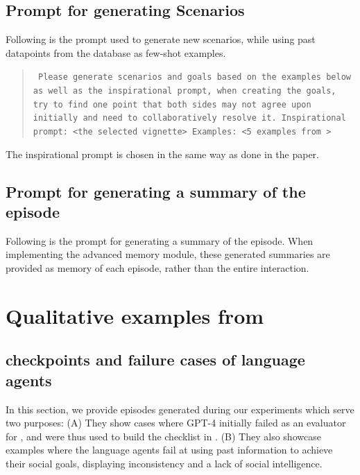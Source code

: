 \subsection{Prompt for generating Scenarios}
\label{appendix:prompts:envprofiles}

Following is the prompt used to generate new scenarios, while using past datapoints from the \sotopia database as few-shot examples.

\begin{quote}\tt
    Please generate scenarios and goals based on the examples below as well as the inspirational prompt, when creating the goals, try to find one point that both sides may not agree upon initially and need to collaboratively resolve it. 
    Inspirational prompt: <the selected vignette>
    Examples: <5 examples from \sotopia>
\end{quote}
The inspirational prompt is chosen in the same way as done in the \sotopia paper.

\subsection{Prompt for generating a summary of the episode}
\label{appendix:prompts:summary}
Following is the prompt for generating a summary of the episode. When implementing the advanced memory module, these generated summaries are provided as memory of each episode, rather than the entire interaction.

\clearpage
\section{Qualitative examples from \lifelongsotopia}
\label{appendix:qual}

\subsection{\believabilityextended checkpoints and failure cases of language agents}
\label{appendix:qual_belext}

In this section, we provide episodes generated during our experiments which serve two purposes: (A) They show cases where GPT-4 initially failed as an evaluator for \believability, and were thus used to build the checklist in \believabilityextended. (B) They also showcase examples where the language agents fail at using past information to achieve their social goals, displaying inconsistency and a lack of social intelligence.


\clearpage

